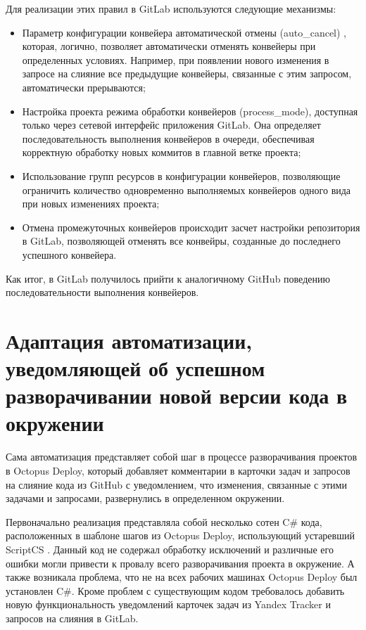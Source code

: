 Для реализации этих правил в GitLab используются следующие механизмы:
\begin{itemize}
  \item Параметр конфигурации конвейера автоматической отмены (auto\_cancel) , которая, логично, позволяет автоматически отменять конвейеры при определенных условиях. Например, при появлении нового изменения в запросе на слияние все предыдущие конвейеры, связанные с этим запросом, автоматически прерываются;
  \item Настройка проекта режима обработки конвейеров (process\_mode), доступная только через сетевой интерфейс приложения GitLab. Она определяет последовательность выполнения конвейеров в очереди, обеспечивая корректную обработку новых коммитов в главной ветке проекта;
  \item Использование групп ресурсов в конфигурации конвейеров, позволяющие ограничить количество одновременно выполняемых конвейеров одного вида при новых изменениях проекта;
  \item Отмена промежуточных конвейеров происходит засчет настройки репозитория в GitLab, позволяющей отменять все конвейры, созданные до последнего успешного конвейера.
\end{itemize}

Как итог, в GitLab получилось прийти к аналогичному GitHub поведению последовательности выполнения конвейеров.


\section{Адаптация автоматизации, уведомляющей об успешном разворачивании новой версии кода в окружении}
Сама автоматизация представляет собой шаг в процессе разворачивания проектов в Octopus Deploy, который добавляет комментарии в карточки задач и запросов на слияние кода из GitHub с уведомлением, что изменения, связанные с этими задачами и запросами, развернулись в определенном окружении.

Первоначально реализация представляла собой несколько сотен C\# кода, расположенных в шаблоне шагов из Octopus Deploy, использующий устаревший ScriptCS \cite{scriptcs}. Данный код не содержал обработку исключений и различные его ошибки могли привести к провалу всего разворачивания проекта в окружение. А также возникала проблема, что не на всех рабочих машинах Octopus Deploy был установлен C\#. Кроме проблем с существующим кодом требовалось добавить новую функциональность уведомлений карточек задач из Yandex Tracker \cite{yandextracker} и запросов на слияния в GitLab.

